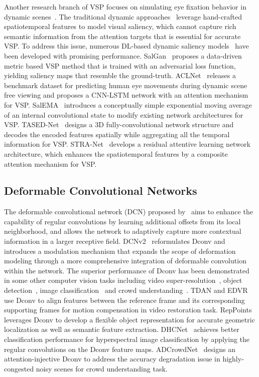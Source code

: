 \documentclass[review]{elsarticle}
\begin{document}
Another research branch of VSP focuses on simulating eye fixation behavior in dynamic scenes~\cite{pan2017salgan,wang2018revisiting,min2019tased,lai2019video}.
The traditional dynamic approaches~\cite{itti2003realistic,zhang2009sunday,ren2013regularized} leverage hand-crafted spatiotemporal features to model visual saliency, which cannot capture rich semantic information from the attention targets that is essential for accurate VSP.
To address this issue, numerous DL-based dynamic saliency models~\cite{pan2017salgan,wang2018revisiting,min2019tased,lai2019video} have been developed with promising performance.
SalGan~\cite{pan2017salgan} proposes a data-driven metric based VSP method that is trained with an adversarial loss function, yielding saliency maps that resemble the ground-truth.
ACLNet~\cite{wang2018revisiting} releases a benchmark dataset for predicting human eye movements during dynamic scene free viewing and proposes a CNN-LSTM network with an attention mechanism for VSP.
SalEMA~\cite{linardos2019simple} introduces a conceptually simple exponential moving average of an internal convolutional state to modify existing network architectures for VSP.
TASED-Net~\cite{min2019tased} designs a 3D fully-convolutional network structure and decodes the encoded features spatially while aggregating all the temporal information for VSP.
STRA-Net~\cite{lai2019video} develops a residual attentive learning network architecture, which enhances the spatiotemporal features by a composite attention mechanism for VSP.
\subsection{Deformable Convolutional Networks}
The deformable convolutional network (DCN) proposed by~\cite{dai2017deformable} aims to enhance the capability of regular convolutions by learning additional offsets from its local neighborhood, and allows the network to adaptively capture more contextual information in a larger receptive field.
DCNv2~\cite{zhu2019deformable} reformulates Dconv and introduces a modulation mechanism that expands the scope of deformation modeling through a more comprehensive integration of deformable convolution within the network.
The superior performance of Dconv has been demonstrated in some other computer vision tasks including video super-resolution~\cite{tian2018tdan,wang2019edvr}, object detection~\cite{yang2019reppoints}, image classification~\cite{zhu2018deformable} and crowd understanding~\cite{liu2019adcrowdnet}.
TDAN and EDVR~\cite{tian2018tdan,wang2019edvr} use Dconv to align features between the reference frame and its corresponding supporting frames for motion compensation in video restoration task.
RepPoints~\cite{yang2019reppoints} leverages Dconv to develop a flexible object representation for accurate geometric localization as well as semantic feature extraction.
DHCNet~\cite{zhu2018deformable} achieves better classification performance for hyperspectral image classification by applying the regular convolutions on the Dconv feature maps.
ADCrowdNet~\cite{liu2019adcrowdnet} designs an attention-injective Dconv to address the accuracy degradation issue in highly-congested noisy scenes for crowd understanding task.
\end{document}
